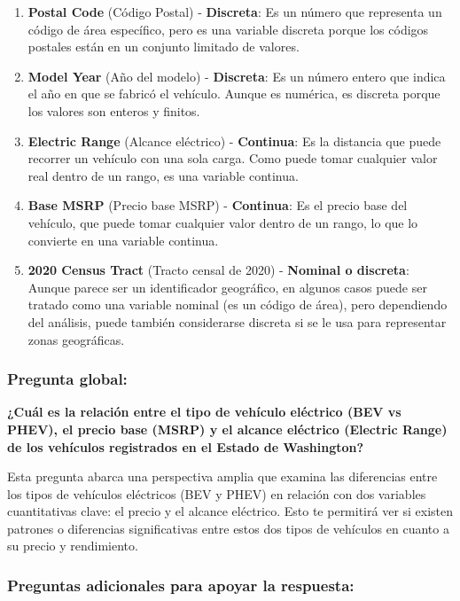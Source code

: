 \documentclass[
]{article}
\begin{document}
\begin{enumerate}
\def\labelenumi{\arabic{enumi}.}
\item
  \textbf{Postal Code} (Código Postal) - \textbf{Discreta}: Es un número
  que representa un código de área específico, pero es una variable
  discreta porque los códigos postales están en un conjunto limitado de
  valores.
\item
  \textbf{Model Year} (Año del modelo) - \textbf{Discreta}: Es un número
  entero que indica el año en que se fabricó el vehículo. Aunque es
  numérica, es discreta porque los valores son enteros y finitos.
\item
  \textbf{Electric Range} (Alcance eléctrico) - \textbf{Continua}: Es la
  distancia que puede recorrer un vehículo con una sola carga. Como
  puede tomar cualquier valor real dentro de un rango, es una variable
  continua.
\item
  \textbf{Base MSRP} (Precio base MSRP) - \textbf{Continua}: Es el
  precio base del vehículo, que puede tomar cualquier valor dentro de un
  rango, lo que lo convierte en una variable continua.
\item
  \textbf{2020 Census Tract} (Tracto censal de 2020) - \textbf{Nominal o
  discreta}: Aunque parece ser un identificador geográfico, en algunos
  casos puede ser tratado como una variable nominal (es un código de
  área), pero dependiendo del análisis, puede también considerarse
  discreta si se le usa para representar zonas geográficas.
\end{enumerate}

\subsubsection{\texorpdfstring{\textbf{Pregunta
global:}}{Pregunta global:}}\label{pregunta-global}

\textbf{¿Cuál es la relación entre el tipo de vehículo eléctrico (BEV vs
PHEV), el precio base (MSRP) y el alcance eléctrico (Electric Range) de
los vehículos registrados en el Estado de Washington?}

Esta pregunta abarca una perspectiva amplia que examina las diferencias
entre los tipos de vehículos eléctricos (BEV y PHEV) en relación con dos
variables cuantitativas clave: el precio y el alcance eléctrico. Esto te
permitirá ver si existen patrones o diferencias significativas entre
estos dos tipos de vehículos en cuanto a su precio y rendimiento.

\subsubsection{\texorpdfstring{\textbf{Preguntas adicionales para apoyar
la
respuesta:}}{Preguntas adicionales para apoyar la respuesta:}}\label{preguntas-adicionales-para-apoyar-la-respuesta}
\end{document}
